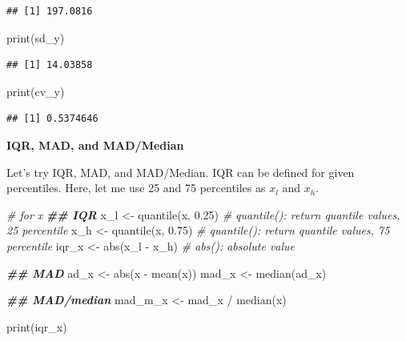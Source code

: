 \documentclass[
]{book}
\newenvironment{Shaded}{\begin{snugshade}}{\end{snugshade}}
\newcommand{\CommentTok}[1]{\textcolor[rgb]{0.56,0.35,0.01}{\textit{#1}}}
\newcommand{\DocumentationTok}[1]{\textcolor[rgb]{0.56,0.35,0.01}{\textbf{\textit{#1}}}}
\newcommand{\FloatTok}[1]{\textcolor[rgb]{0.00,0.00,0.81}{#1}}
\newcommand{\FunctionTok}[1]{\textcolor[rgb]{0.00,0.00,0.00}{#1}}
\newcommand{\NormalTok}[1]{#1}
\newcommand{\OtherTok}[1]{\textcolor[rgb]{0.56,0.35,0.01}{#1}}
\newcommand{\SpecialCharTok}[1]{\textcolor[rgb]{0.00,0.00,0.00}{#1}}
\begin{document}
\begin{verbatim}
## [1] 197.0816
\end{verbatim}

\begin{Shaded}
\begin{Highlighting}[]
\FunctionTok{print}\NormalTok{(sd\_y)}
\end{Highlighting}
\end{Shaded}

\begin{verbatim}
## [1] 14.03858
\end{verbatim}

\begin{Shaded}
\begin{Highlighting}[]
\FunctionTok{print}\NormalTok{(cv\_y)}
\end{Highlighting}
\end{Shaded}

\begin{verbatim}
## [1] 0.5374646
\end{verbatim}

\textbf{IQR, MAD, and MAD/Median}

Let's try IQR, MAD, and MAD/Median. IQR can be defined for given percentiles. Here, let me use 25 and 75 percentiles as \(x_l\) and \(x_h\).

\begin{Shaded}
\begin{Highlighting}[]
\CommentTok{\# for x}
\DocumentationTok{\#\# IQR}
\NormalTok{x\_l }\OtherTok{\textless{}{-}} \FunctionTok{quantile}\NormalTok{(x, }\FloatTok{0.25}\NormalTok{) }\CommentTok{\# quantile(): return quantile values, 25 percentile}
\NormalTok{x\_h }\OtherTok{\textless{}{-}} \FunctionTok{quantile}\NormalTok{(x, }\FloatTok{0.75}\NormalTok{) }\CommentTok{\# quantile(): return quantile values, 75 percentile}
\NormalTok{iqr\_x }\OtherTok{\textless{}{-}} \FunctionTok{abs}\NormalTok{(x\_l }\SpecialCharTok{{-}}\NormalTok{ x\_h) }\CommentTok{\# abs(): absolute value}

\DocumentationTok{\#\# MAD}
\NormalTok{ad\_x }\OtherTok{\textless{}{-}} \FunctionTok{abs}\NormalTok{(x }\SpecialCharTok{{-}} \FunctionTok{mean}\NormalTok{(x))}
\NormalTok{mad\_x }\OtherTok{\textless{}{-}} \FunctionTok{median}\NormalTok{(ad\_x)}

\DocumentationTok{\#\# MAD/median}
\NormalTok{mad\_m\_x }\OtherTok{\textless{}{-}}\NormalTok{ mad\_x }\SpecialCharTok{/} \FunctionTok{median}\NormalTok{(x)}

\FunctionTok{print}\NormalTok{(iqr\_x)}
\end{Highlighting}
\end{Shaded}
\end{document}
